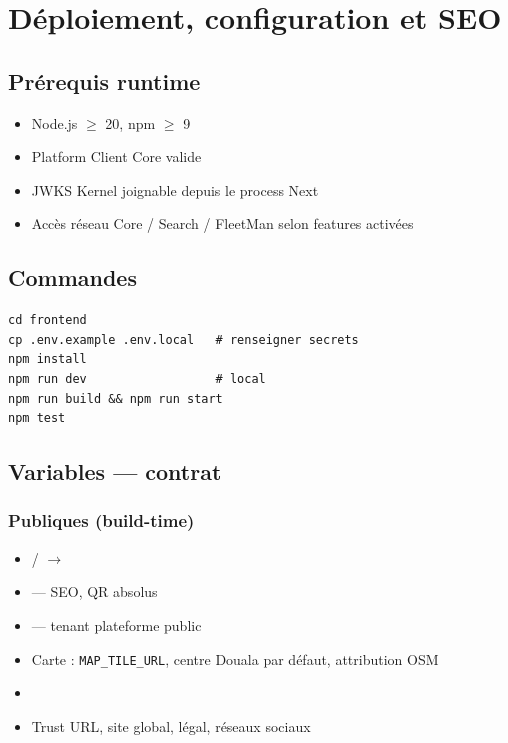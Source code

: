 \chapter{Déploiement, configuration et SEO}

\section{Prérequis runtime}

\begin{itemize}
  \item Node.js $\geq$ 20, npm $\geq$ 9
  \item Platform Client Core valide
  \item JWKS Kernel joignable depuis le process Next
  \item Accès réseau Core / Search / FleetMan selon features activées
\end{itemize}

\section{Commandes}

\begin{lstlisting}
cd frontend
cp .env.example .env.local   # renseigner secrets
npm install
npm run dev                  # local
npm run build && npm run start
npm test
\end{lstlisting}

\section{Variables --- contrat }

\subsection{Publiques (build-time)}

\begin{itemize}
  \item {} /
         $\rightarrow$ 
  \item {} --- SEO, QR absolus
  \item {} --- tenant plateforme public
  \item Carte : \texttt{MAP\_TILE\_URL}, centre Douala par défaut, attribution OSM
  \item {}
  \item Trust URL, site global, légal, réseaux sociaux
\end{itemize}

